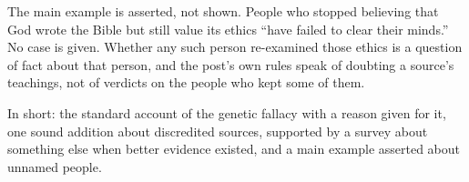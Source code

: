 \begin{afterword}
The main example is asserted, not shown. People who stopped believing that God wrote the Bible but still value its ethics ``have failed to clear their minds.'' No case is given. Whether any such person re-examined those ethics is a question of fact about that person, and the post's own rules speak of doubting a source's teachings, not of verdicts on the people who kept some of them.

In short: the standard account of the genetic fallacy with a reason given for it, one sound addition about discredited sources, supported by a survey about something else when better evidence existed, and a main example asserted about unnamed people.
\end{afterword}
